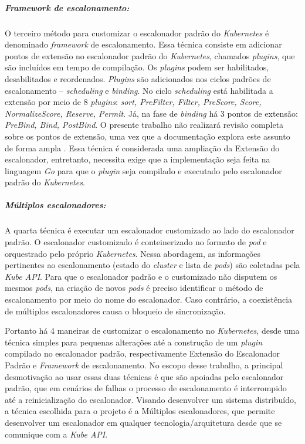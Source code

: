 \subparagraph{\textit{Framework} de escalonamento:}
O terceiro método para customizar o escalonador padrão do \textit{Kubernetes} é denominado \textit{framework} de escalonamento. Essa técnica consiste em adicionar pontos de extensão no escalonador padrão do \textit{Kubernetes}, chamados \textit{plugins}, que são incluídos em tempo de compilação. Os \textit{plugins} podem ser habilitados, desabilitados e reordenados. \textit{Plugins} são adicionados nos ciclos padrões de escalonamento -- \textit{scheduling} e \textit{binding}. No ciclo \textit{scheduling} está habilitada a extensão por meio de 8 \textit{plugins}: \textit{sort, PreFilter, Filter, PreScore, Score, NormalizeScore, Reserve, Permit}. Já, na fase de \textit{binding} há 3 pontos de extensão: \textit{PreBind, Bind, PostBind}. O presente trabalho não realizará revisão completa sobre os pontos de extensão, uma vez que a documentação explora este assunto de forma ampla \cite{schedulerframework}. Essa técnica é considerada uma ampliação da Extensão do escalonador, entretanto, necessita exige que a implementação seja feita na linguagem \textit{Go} para que o \textit{plugin} seja compilado e executado pelo escalonador padrão do \textit{Kubernetes}.

\subparagraph{Múltiplos escalonadores:}
A quarta técnica é executar um escalonador customizado ao lado do escalonador padrão. O escalonador customizado é conteinerizado no formato de \textit{pod} e orquestrado pelo próprio \textit{Kubernetes}. Nessa abordagem, as informações pertinentes ao escalonamento (estado do \textit{cluster} e lista de \textit{pods}) são coletadas pela \textit{Kube API}. Para que o escalonador padrão e o customizado não disputem os mesmos \textit{pods}, na criação de novos \textit{pods} é preciso identificar o método de escalonamento por meio do nome do escalonador. Caso contrário, a coexistência de múltiplos escalonadores causa o bloqueio de sincronização.

Portanto há 4 maneiras de customizar o escalonamento no \textit{Kubernetes}, desde uma técnica simples para pequenas alterações até a construção de um \textit{plugin} compilado no escalonador padrão, respectivamente Extensão do Escalonador Padrão e \textit{Framework} de escalonamento. No escopo desse trabalho, a principal desmotivação ao usar essas duas técnicas é que são apoiadas pelo escalonador padrão, que em cenários de falhas o processo de escalonamento é interrompido até a reinicialização do escalonador. Visando desenvolver um sistema distribuído, a técnica escolhida para o projeto é a Múltiplos escalonadores, que permite desenvolver um escalonador em qualquer tecnologia/arquitetura desde que se comunique com a \textit{Kube API}.

